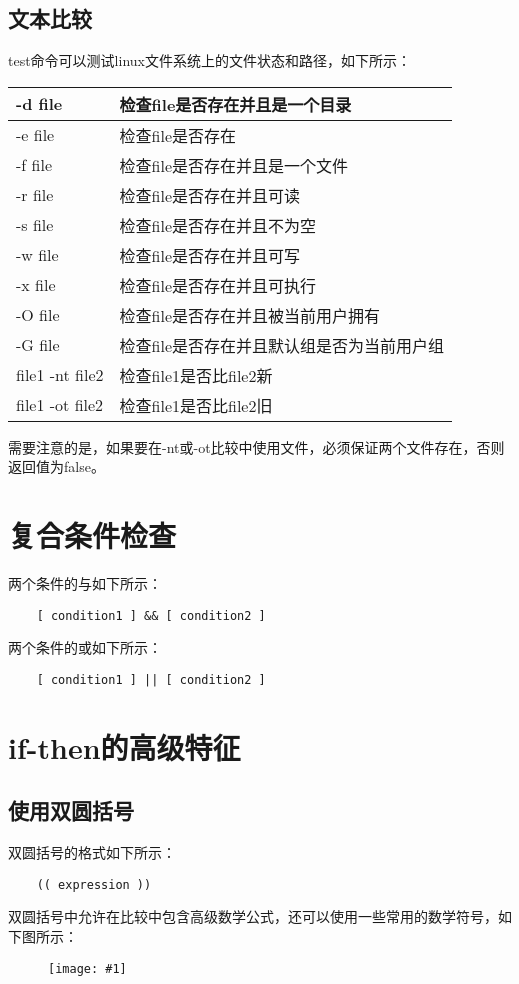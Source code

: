 \documentclass[a4paper,left=2.5cm,right=2.5cm,11pt]{article}
\newcommand{\fic}[1]{\begin{figure}[H]
		\center
		\texttt{[image: \#1]}
	\end{figure}}
\begin{document}
\subsection{文本比较}
	test命令可以测试linux文件系统上的文件状态和路径，如下所示：
	\begin{longtable}{p{2cm}p{6cm}}
	\hline
	-d file & 检查file是否存在并且是一个目录 \\
	\hline
	-e file & 检查file是否存在 \\
	\hline
	-f file & 检查file是否存在并且是一个文件 \\
	\hline
	-r file & 检查file是否存在并且可读 \\
	\hline
	-s file & 检查file是否存在并且不为空 \\
	\hline
	-w file & 检查file是否存在并且可写 \\
	\hline
	-x file & 检查file是否存在并且可执行 \\
	\hline
	-O file & 检查file是否存在并且被当前用户拥有 \\
	\hline
	-G file & 检查file是否存在并且默认组是否为当前用户组 \\
	\hline
	file1 -nt file2 & 检查file1是否比file2新 \\
	\hline
	file1 -ot file2 & 检查file1是否比file2旧 \\
	\hline
	\end{longtable}

	需要注意的是，如果要在-nt或-ot比较中使用文件，必须保证两个文件存在，否则返回值为false。

\section{复合条件检查}
	两个条件的与如下所示：
	\begin{lstlisting}
	[ condition1 ] && [ condition2 ]
	\end{lstlisting}

	两个条件的或如下所示：
	\begin{lstlisting}
	[ condition1 ] || [ condition2 ]
	\end{lstlisting}

\section{if-then的高级特征}
\subsection{使用双圆括号}
	双圆括号的格式如下所示：
	\begin{lstlisting}
	(( expression ))
	\end{lstlisting}
	双圆括号中允许在比较中包含高级数学公式，还可以使用一些常用的数学符号，如下图所示：
	\fic{3.png}
\end{document}
